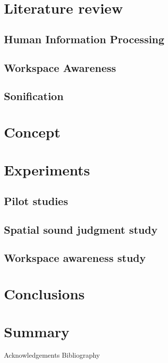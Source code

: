 \chapter{Literature review}
\section{Human Information Processing}
\section{Workspace Awareness}
\section{Sonification}
\chapter{Concept}
\chapter{Experiments}
\section{Pilot studies}
\section{Spatial sound judgment study}
\section{Workspace awareness study}
\chapter{Conclusions}
\chapter{Summary}

Acknowledgements 
Bibliography







